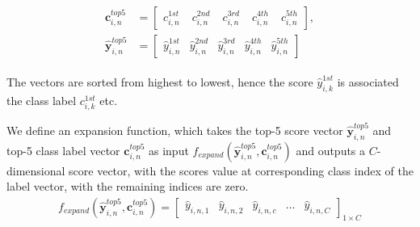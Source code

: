 \begin{align}
\begin{split}
\mathbf{c}_{i,n}^{top5} &= \begin{bmatrix}
c_{i,n}^{1st} & \phantom{.}c_{i,n}^{2nd} & \phantom{.}c_{i,n}^{3rd} & \phantom{.}c_{i,n}^{4th} & \phantom{.}c_{i,n}^{5th}
\end{bmatrix}, \\
\bm{\hat{y}}^{top5}_{i,n} &= \begin{bmatrix}
\hat{y}_{i,n}^{1st} & \hat{y}_{i,n}^{2nd} & \hat{y}_{i,n}^{3rd} & \hat{y}_{i,n}^{4th} & \hat{y}_{i,n}^{5th}
\end{bmatrix}
\end{split}
\end{align}

The vectors are sorted from highest to lowest, hence the score $ \hat{y}_{i,k}^{1st} $ is associated the class label $ c_{i,k}^{1st} $ etc. 

We define an expansion function, which takes the top-5 score vector $ \bm{\hat{y}}_{i,n}^{top5}$ and top-5 class label vector  $\bm{c}_{i,n}^{top5}$ as input  $ f_{expand}\left(\bm{\hat{y}}_{i,n}^{top5},\bm{c}_{i,n}^{top5}\right) $ and outputs a $ C $-dimensional score vector, with the scores value at corresponding class index of the label vector, with the remaining indices are zero.
\begin{align}
f_{expand}\left(\bm{\hat{y}}_{i,n}^{top5},\bm{c}_{i,n}^{top5}\right) = 
\begin{bmatrix}
\hat{y}_{i,n,1} & \hat{y}_{i,n,2} & \hat{y}_{i,n,c} & \dots & \hat{y}_{i,n,C}
\end{bmatrix}_{1 \times C}
\end{align}


